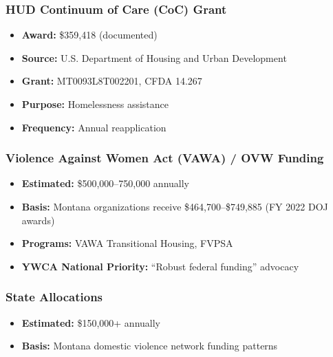 \documentclass[11pt,letterpaper]{article}
\begin{document}
\subsubsection{HUD Continuum of Care (CoC) Grant}
\begin{itemize}[leftmargin=*]
\item \textbf{Award:} \$359,418 (documented)
\item \textbf{Source:} U.S. Department of Housing and Urban Development
\item \textbf{Grant:} MT0093L8T002201, CFDA 14.267
\item \textbf{Purpose:} Homelessness assistance
\item \textbf{Frequency:} Annual reapplication
\end{itemize}

\subsubsection{Violence Against Women Act (VAWA) / OVW Funding}
\begin{itemize}[leftmargin=*]
\item \textbf{Estimated:} \$500,000--750,000 annually
\item \textbf{Basis:} Montana organizations receive \$464,700--\$749,885 (FY 2022 DOJ awards)
\item \textbf{Programs:} VAWA Transitional Housing, FVPSA
\item \textbf{YWCA National Priority:} ``Robust federal funding'' advocacy
\end{itemize}

\subsubsection{State Allocations}
\begin{itemize}[leftmargin=*]
\item \textbf{Estimated:} \$150,000+ annually
\item \textbf{Basis:} Montana domestic violence network funding patterns
\end{itemize}

\begin{center}
\end{center}
\end{document}
